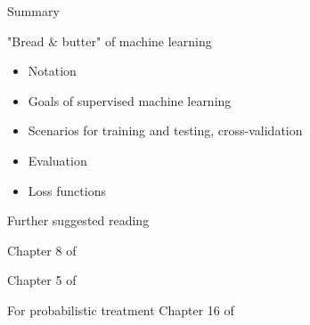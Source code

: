 \documentclass[12pt]{beamer}
\begin{document}
\begin{frame}{Summary}
	
"Bread \& butter" of machine learning

\begin{itemize}
	\item Notation
	\item Goals of supervised machine learning
	\item Scenarios for training and testing, cross-validation
	\item Evaluation
	\item Loss functions
\end{itemize}

\end{frame}

\begin{frame}{Further suggested reading}

Chapter 8 of 

Chapter 5 of 

For probabilistic treatment Chapter 16 of 


\end{frame}

%  
%  
\end{document}
